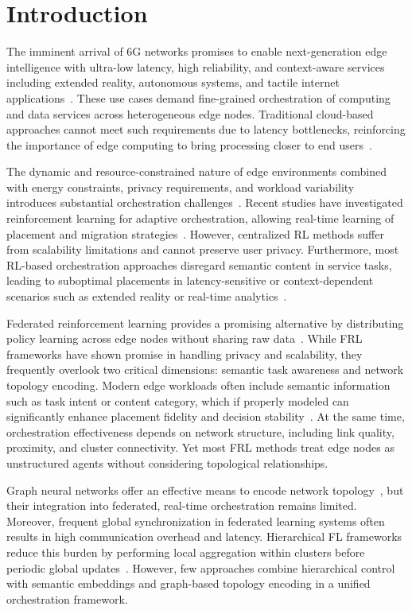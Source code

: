 \section{Introduction}

The imminent arrival of 6G networks promises to enable next-generation edge intelligence with ultra-low latency, high reliability, and context-aware services including extended reality, autonomous systems, and tactile internet applications~\cite{Lou2022_CostEffectiveScheduling, Wang2025_AverageReliabilityOptimal}. These use cases demand fine-grained orchestration of computing and data services across heterogeneous edge nodes. Traditional cloud-based approaches cannot meet such requirements due to latency bottlenecks, reinforcing the importance of edge computing to bring processing closer to end users~\cite{Xu2023_FedLC}.

The dynamic and resource-constrained nature of edge environments combined with energy constraints, privacy requirements, and workload variability introduces substantial orchestration challenges~\cite{Yuan2025}. Recent studies have investigated reinforcement learning for adaptive orchestration, allowing real-time learning of placement and migration strategies~\cite{Yuan2025}. However, centralized RL methods suffer from scalability limitations and cannot preserve user privacy. Furthermore, most RL-based orchestration approaches disregard semantic content in service tasks, leading to suboptimal placements in latency-sensitive or context-dependent scenarios such as extended reality or real-time analytics~\cite{Yu2025}.

Federated reinforcement learning provides a promising alternative by distributing policy learning across edge nodes without sharing raw data~\cite{Chen2025_FRL}. While FRL frameworks have shown promise in handling privacy and scalability, they frequently overlook two critical dimensions: semantic task awareness and network topology encoding. Modern edge workloads often include semantic information such as task intent or content category, which if properly modeled can significantly enhance placement fidelity and decision stability~\cite{Wu2024_FRLEdgeComputing}. At the same time, orchestration effectiveness depends on network structure, including link quality, proximity, and cluster connectivity. Yet most FRL methods treat edge nodes as unstructured agents without considering topological relationships.

Graph neural networks offer an effective means to encode network topology~\cite{Sagar2025_HAFedRL}, but their integration into federated, real-time orchestration remains limited. Moreover, frequent global synchronization in federated learning systems often results in high communication overhead and latency. Hierarchical FL frameworks reduce this burden by performing local aggregation within clusters before periodic global updates~\cite{Ma2024_HierarchicalFL}. However, few approaches combine hierarchical control with semantic embeddings and graph-based topology encoding in a unified orchestration framework.

